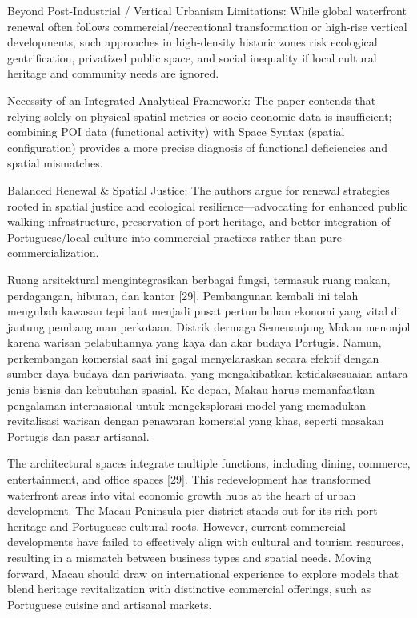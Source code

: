 \documentclass[../riset_senja.tex]{subfiles}
\begin{document}
Beyond Post-Industrial / Vertical Urbanism Limitations: While global waterfront renewal often follows commercial/recreational transformation or high-rise vertical developments, such approaches in high-density historic zones risk ecological gentrification, privatized public space, and social inequality if local cultural heritage and community needs are ignored.

Necessity of an Integrated Analytical Framework: The paper contends that relying solely on physical spatial metrics or socio-economic data is insufficient; combining POI data (functional activity) with Space Syntax (spatial configuration) provides a more precise diagnosis of functional deficiencies and spatial mismatches.

Balanced Renewal \& Spatial Justice: The authors argue for renewal strategies rooted in spatial justice and ecological resilience—advocating for enhanced public walking infrastructure, preservation of port heritage, and better integration of Portuguese/local culture into commercial practices rather than pure commercialization.



Ruang arsitektural mengintegrasikan berbagai fungsi, termasuk ruang makan, perdagangan, hiburan, dan kantor [29]. Pembangunan kembali ini telah mengubah kawasan tepi laut menjadi pusat pertumbuhan ekonomi yang vital di jantung pembangunan perkotaan. Distrik dermaga Semenanjung Makau menonjol karena warisan pelabuhannya yang kaya dan akar budaya Portugis. Namun, perkembangan komersial saat ini gagal menyelaraskan secara efektif dengan sumber daya budaya dan pariwisata, yang mengakibatkan ketidaksesuaian antara jenis bisnis dan kebutuhan spasial. Ke depan, Makau harus memanfaatkan pengalaman internasional untuk mengeksplorasi model yang memadukan revitalisasi warisan dengan penawaran komersial yang khas, seperti masakan Portugis dan pasar artisanal.

The architectural spaces integrate multiple functions, including dining, commerce, entertainment, and office spaces [29]. This redevelopment has transformed waterfront areas into vital economic growth hubs at the heart of urban development. The Macau Peninsula pier district stands out for its rich port heritage and Portuguese cultural roots. However, current commercial developments have failed to effectively align with cultural and tourism resources, resulting in a mismatch between business types and spatial needs. Moving forward, Macau should draw on international experience to explore models that blend heritage revitalization with distinctive commercial offerings, such as Portuguese cuisine and artisanal markets.
\end{document}
